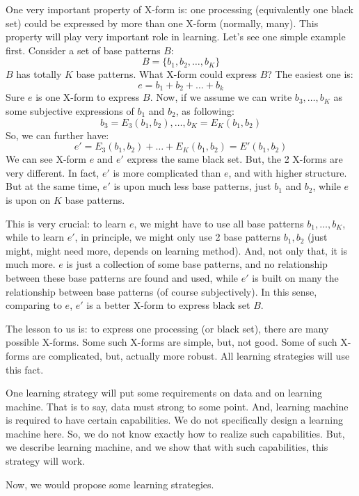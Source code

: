 One very important property of X-form is: one processing (equivalently one black set) could be expressed by more than one X-form (normally, many). This property will play very important role in learning. Let's see one simple example first. Consider a set of base patterns $B$:
\[
B = \{ b_1, b_2, \ldots, b_K \}    \label{eq:bset} \tag{bs}
\]
$B$ has totally $K$ base patterns. What X-form could express $B$? The easiest one is:
\[
e = b_1 + b_2 + \ldots + b_k   \label{eq:exp} \tag{exp}
\]
Sure $e$ is one X-form to express $B$. Now, if we assume we can write $b_3, \ldots, b_K$ as some subjective expressions of $b_1$ and $b_2$, as following:
\[
b_3 = E_3 (b_1, b_2), \ldots, b_K = E_K (b_1, b_2)
\]
So, we can further have:
\[
e' = E_3 (b_1, b_2) + \ldots + E_K (b_1, b_2) = E' (b_1, b_2)  \label{eq:exp2} \tag{exp2}
\]
We can see X-form $e$ and $e'$ express the same black set. But, the 2 X-forms are very different. In fact, $e'$ is more complicated than $e$, and with higher structure. But at the same time, $e'$ is upon much less base patterns, just $b_1$ and $b_2$, while $e$ is upon on $K$ base patterns. 

This is very crucial: to learn $e$, we might have to use all base patterns $b_1, \ldots, b_K$, while to learn $e'$, in principle, we might only use 2 base patterns $b_1, b_2$ (just might, might need more, depends on learning method). And, not only that, it is much more. $e$ is just a collection of some base patterns, and no relationship between these base patterns are found and used, while $e'$ is built on many the relationship between base patterns (of course subjectively). In this sense, comparing to $e$, $e'$ is a better X-form to express black set $B$.  

The lesson to us is: to express one processing (or black set), there are many possible X-forms. Some such X-forms are simple, but, not good. Some of such X-forms are complicated, but, actually more robust. All learning strategies will use this fact.

One learning strategy will put some requirements on data and on learning machine. That is to say, data must strong to some point. And, learning machine is required to have certain capabilities. We do not specifically design a learning machine here. So, we do not know exactly how to realize such capabilities. But, we describe learning machine, and we show that with such capabilities, this strategy will work.

Now, we would propose some learning strategies. 
\bigskip

